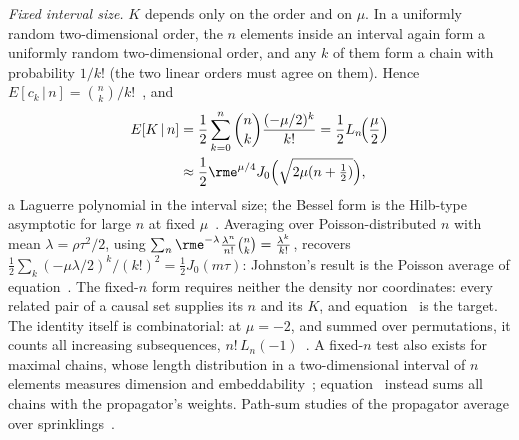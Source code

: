\documentclass[12pt]{iopart}
\begin{document}
\emph{Fixed interval size.} $K$ depends only on the order and on $\mu$. In a uniformly random two-dimensional order, the $n$ elements inside an interval again form a uniformly random two-dimensional order, and any $k$ of them form a chain with probability $1/k!$ (the two linear orders must agree on them). Hence $E[c_k\,|\,n]=\binom nk/k!$~\cite{Pinsky06}, and
\begin{equation}
\begin{aligned}
E[K\,|\,n]&=\frac12\sum_{k=0}^n\binom nk\frac{(-\mu/2)^k}{k!}=\frac12L_n\!\Big(\frac\mu2\Big)\\
&\approx\frac12\rme^{\mu/4}J_0\Big(\sqrt{2\mu(n+\tfrac12)}\Big),
\end{aligned}
\label{eq:lag}
\end{equation}
a Laguerre polynomial in the interval size; the Bessel form is the Hilb-type asymptotic for large $n$ at fixed $\mu$~\cite{Szego39}. Averaging over Poisson-distributed $n$ with mean $\lambda=\rho\tau^2/2$, using $\sum_n\rme^{-\lambda}\frac{\lambda^n}{n!}\binom nk=\frac{\lambda^k}{k!}$, recovers $\tfrac12\sum_k(-\mu\lambda/2)^k/(k!)^2=\tfrac12J_0(m\tau)$: Johnston's result is the Poisson average of equation~. The fixed-$n$ form requires neither the density nor coordinates: every related pair of a causal set supplies its $n$ and its $K$, and equation~ is the target. The identity itself is combinatorial: at $\mu=-2$, and summed over permutations, it counts all increasing subsequences, $n!\,L_n(-1)$~\cite{LifschitzPittel81,OEIS}. A fixed-$n$ test also exists for maximal chains, whose length distribution in a two-dimensional interval of $n$ elements measures dimension and embeddability~\cite{ABP18}; equation~ instead sums all chains with the propagator's weights. Path-sum studies of the propagator average over sprinklings~\cite{Shuman23,KastratiHinrichsen26}.
\end{document}
